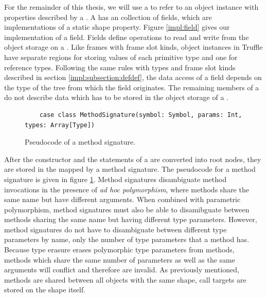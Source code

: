 For the remainder of this thesis, we will use a  to refer to an object instance with properties described by a .
A  has an collection of fields, which are implementations of a static shape property.
Figure \ref{impl:field} gives our implementation of a field.
Fields define operations to read and write from the object storage on a .
Like frames with frame slot kinds, object instances in Truffle have separate regions for storing values of each primitive type and one for reference types.
Following the same rules with types and frame slot kinds described in section \ref{impl:subsection:defdef}, the data access of a field depends on the type of the  tree from which the field originates.
The remaining members of a  do not describe data which has to be stored in the object storage of a .

\begin{figure}[!htb]
	\begin{verbatim}
	case class MethodSignature(symbol: Symbol, params: Int, types: Array[Type])
	\end{verbatim}
	\caption{Pseudocode of a method signature.}
	\label{impl:method-signature}
\end{figure}

After the constructor and the  statements of a  are converted into root nodes, they are stored in the  mapped by a method signature.
The pseudocode for a method signature is given in figure \ref{impl:method-signature}.
Method signatures disambiguate method invocations in the presence of \textit{ad hoc polymorphism}\cite{strachey:fundamental-concepts}, where methods share the same name but have different arguments.
When combined with parametric polymorphism, method signatures must also be able to disamibguate between methods sharing the same name but having different type parameters.
However, method signatures do not have to disambiguate between different type parameters by name, only the number of type parameters that a method has.
Because type erasure erases polymorphic type parameters from methods, methods which share the same number of parameters as well as the same arguments will conflict and therefore are invalid.
As previously mentioned, methods are shared between all  objects with the same shape, call targets are stored on the shape itself.

